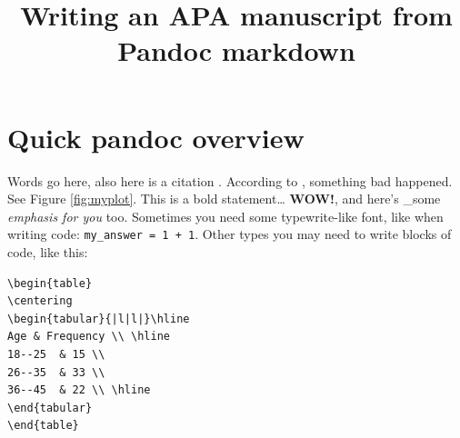 \documentclass[doc,longtable]{apa6}
\title{Writing an APA manuscript from Pandoc markdown}
\begin{document}
\maketitle

\makeatletter
\def\LT@makenoprefixcaption#1#2#3{%
  \LT@mcol\LT@cols c{\hbox to\z@{\hss\parbox[t]\LTcapwidth{
    \sbox\@tempboxa{#1{}#3}
    \ifdim\wd\@tempboxa>\hsize
      #1{}#3
    \else
      \hbox to\hsize{\hfil\box\@tempboxa\hfil}%
    \fi
    \endgraf\vskip\baselineskip}
  \hss}}}
\makeatother

\makeatletter
\let\LT@oldmakecaption=\LT@makecaption
\let\oldthetable=\thetable
\let\oldtheHtable=\theHtable
\makeatother

\makeatletter
{}
\newenvironment{no-prefix-table-caption}{
  \let\LT@makecaption=\LT@makenoprefixcaption
  \renewcommand\thetable{x.\thetableno}
  \renewcommand\theHtable{x.\thetableno}
  \stepcounter{tableno}
}{
  \let\thetable=\oldthetable
  \let\theHtable=\oldtheHtable
  \let\LT@makecaption=\LT@oldmakecaption
  \addtocounter{table}{-1}
}
\makeatother

\section{Quick pandoc overview}\label{quick-pandoc-overview}

Words go here, also here is a citation \autocite{someArticle}. According to \textcite{anotherArticle}, something bad happened. See Figure \ref{fig:myplot}. This is a bold statement\ldots{} \textbf{WOW!}, and here's \_some \emph{emphasis for you} too. Sometimes you need some typewrite-like font, like when writing code: \texttt{my\_answer\ =\ 1\ +\ 1}. Other types you may need to write blocks of code, like this:

\begin{verbatim}
\begin{table}
\centering
\begin{tabular}{|l|l|}\hline
Age & Frequency \\ \hline
18--25  & 15 \\
26--35  & 33 \\
36--45  & 22 \\ \hline
\end{tabular}
\end{table}
\end{verbatim}
\end{document}
